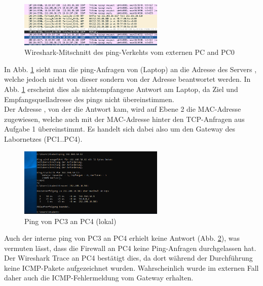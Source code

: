 \documentclass[11pt, a4paper]{article}
\begin{document}
\begin{figure}[H]
  \centering
  \includegraphics[width=0.618\textwidth]
  {graphics/bilder/32/ping_laptop_pc0_reply}
  \caption{Wireshark-Mitschnitt des ping-Verkehts vom externen PC and PC0}\label{ping_laptop_pc0_reply}
\end{figure}

In Abb. \ref{ping_laptop_pc0_reply} sieht man die ping-Anfragen von
 (Laptop) an die Adresse des Servers ,
welche jedoch nicht von dieser sondern von der Adresse 
beantwortet werden. In Abb. \ref{ping_laptop_pc0_reply} erscheint dies als nichtempfangene
Antwort am Laptop, da Ziel und Empfangsquelladresse des pings nicht übereinstimmen.\\

Der Adresse , von der die Antwort kam, wird auf Ebene
2 die MAC-Adresse  zugewiesen, welche auch mit
der MAC-Adresse hinter den TCP-Anfragen aus Aufgabe 1 übereinstimmt. Es handelt
sich dabei also um den Gateway des Labornetzes (PC1..PC4).

\begin{figure}[H]
  \centering
  \includegraphics[width=0.618\textwidth]
  {graphics/bilder/32/32_tracrt_intern_erfolgreich}
  \caption{Ping von PC3 an PC4 (lokal)}\label{ping_internx}
\end{figure}

Auch der interne ping von PC3 an PC4 erhielt keine Antwort (Abb. \ref{ping_internx}),
was vermuten lässt, dass die Firewall an PC4 keine Ping-Anfragen durchgelassen hat.
Der Wireshark Trace an PC4 bestätigt dies, da dort während der Durchführung keine
ICMP-Pakete aufgezeichnet wurden. Wahrscheinlich wurde im externen Fall daher
auch die ICMP-Fehlermeldung vom Gateway erhalten.\\
\end{document}
